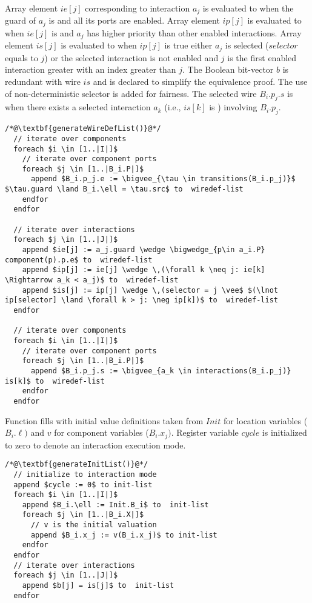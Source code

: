 Array element $ie[j]$ corresponding to interaction $a_j$ is evaluated to \true when the guard of $a_j$ is \true and all its ports are enabled. Array element $ip[j]$ is evaluated to \true when $ie[j]$ is \true and $a_j$ has higher priority than other enabled interactions. 
Array element $is[j]$ is evaluated to \true when $ip[j]$ is true either $a_j$ is selected ($selector$ equals to $j$) or the selected interaction is not enabled and $j$ is the first enabled interaction greater with an index greater than $j$. 
The Boolean bit-vector $b$ is redundant with wire $is$ and is declared to simplify the equivalence proof. 
The use of non-deterministic selector is added for fairness. 
The selected wire $B_i.p_j.s$ is \true when there exists a selected interaction $a_k$ (i.e., $is[k]$ is \true) involving $B_i.p_j$.
\begin{lstlisting}
/*@\textbf{generateWireDefList()}@*/
  // iterate over components
  foreach $i \in [1..|I|]$ 
    // iterate over component ports
    foreach $j \in [1..|B_i.P|]$ 
      append $B_i.p_j.e := \bigvee_{\tau \in transitions(B_i.p_j)}$ $\tau.guard \land B_i.\ell = \tau.src$ to  wiredef-list 
    endfor
  endfor
  
  // iterate over interactions
  foreach $j \in [1..|J|]$ 
    append $ie[j] := a_j.guard \wedge \bigwedge_{p\in a_i.P} component(p).p.e$ to  wiredef-list 
    append $ip[j] := ie[j] \wedge \,(\forall k \neq j: ie[k] \Rightarrow a_k < a_j)$ to  wiredef-list 
    append $is[j] := ip[j] \wedge \,(selector = j \vee$ $(\lnot ip[selector] \land \forall k > j: \neg ip[k])$ to  wiredef-list 
  endfor
  
  // iterate over components
  foreach $i \in [1..|I|]$ 
    // iterate over component ports
    foreach $j \in [1..|B_i.P|]$ 
      append $B_i.p_j.s := \bigvee_{a_k \in interactions(B_i.p_j)} is[k]$ to  wiredef-list 
    endfor
  endfor
\end{lstlisting}

Function  fills  with initial value definitions taken from $Init$ for location variables ($B_i.\ell)$ and $v$ for component variables ($B_i.x_j)$. Register variable $cycle$ is initialized to zero to denote an interaction execution mode. 

\begin{lstlisting}
/*@\textbf{generateInitList()}@*/
  // initialize to interaction mode
  append $cycle := 0$ to init-list 
  foreach $i \in [1..|I|]$
    append $B_i.\ell := Init.B_i$ to  init-list 
    foreach $j \in [1..|B_i.X|]$
      // v is the initial valuation
      append $B_i.x_j := v(B_i.x_j)$ to init-list  
    endfor
  endfor
  // iterate over interactions
  foreach $j \in [1..|J|]$ 
    append $b[j] = is[j]$ to  init-list 
  endfor
\end{lstlisting}

